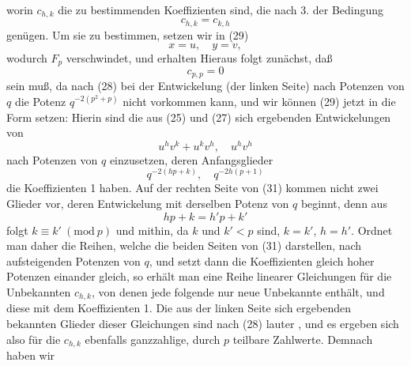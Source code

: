 worin $c_{h,k}$ die zu bestimmenden Koeffizienten sind, die nach 3. der Bedingung
\[
c_{h,k} = c_{k,h}
\]
genügen. Um sie zu bestimmen, setzen wir in (29)
\[
x = u, \quad y = v,
\]
wodurch $F_p$ verschwindet, und erhalten
Hieraus folgt zunächst, daß
\[
c_{p,p} = 0
\]
sein muß, da nach (28) bei der Entwickelung (der linken Seite) nach Potenzen von $q$ die Potenz $q^{-2(p^2+p)}$ nicht vorkommen kann, und wir können (29) jetzt in die Form setzen:
Hierin sind die aus (25) und (27) sich ergebenden Entwickelungen von
\[
u^h v^k + u^k v^h, \quad u^h v^h
\]
nach Potenzen von $q$ einzusetzen, deren Anfangsglieder
\[
q^{-2(hp+k)}, \quad q^{-2h(p+1)}
\]
die Koeffizienten 1 haben.
Auf der rechten Seite von (31) kommen nicht zwei Glieder vor, deren Entwickelung mit derselben Potenz von $q$ beginnt, denn aus
\[
hp + k = h'p + k'
\]
folgt $k \equiv k'\ (\mathrm{mod}\ p)$ und mithin, da $k$ und $k' < p$ sind, $k = k'$, $h = h'$.
Ordnet man daher die Reihen, welche die beiden Seiten von (31) darstellen, nach aufsteigenden Potenzen von $q$, und setzt dann die Koeffizienten gleich hoher Potenzen einander gleich, so erhält man eine Reihe linearer Gleichungen für die Unbekannten $c_{h,k}$, von denen jede folgende nur  neue Unbekannte enthält, und diese mit dem Koeffizienten 1. Die aus der linken Seite sich ergebenden bekannten Glieder dieser Gleichungen sind nach (28) lauter , und es ergeben sich also für die $c_{h,k}$ ebenfalls ganzzahlige, durch $p$ teilbare Zahlwerte. Demnach haben wir
